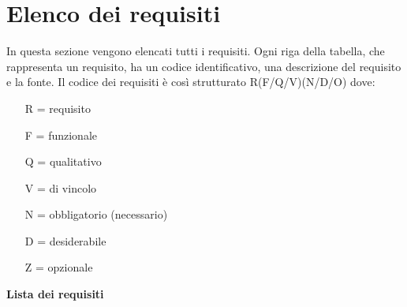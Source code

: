 \chapter{Elenco dei requisiti}
\label{cap:appendice b}
In questa sezione vengono elencati tutti i requisiti. Ogni riga della tabella, che rappresenta un requisito, ha un codice identificativo, una descrizione del requisito e la fonte.
Il codice dei requisiti è così strutturato R(F/Q/V)(N/D/O) dove:
\begin{enumerate}
	\item[R =] requisito
    \item[F =] funzionale
    \item[Q =] qualitativo
    \item[V =] di vincolo
    \item[N =] obbligatorio (necessario)
    \item[D =] desiderabile
    \item[Z =] opzionale
\end{enumerate}
\textbf{Lista dei requisiti}
